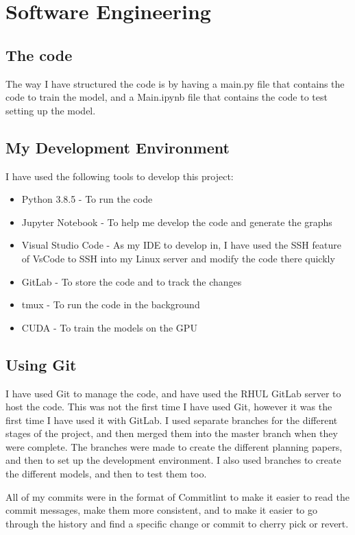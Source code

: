 \documentclass[]{final_report}
\begin{document}
\chapter{Software Engineering}
\section{The code}
The way I have structured the code is by having a main.py file that contains the code to train the model, and a Main.ipynb file that contains the code to test setting up the model.

\section{My Development Environment}
I have used the following tools to develop this project:
\begin{itemize}
    \item Python 3.8.5\cite{Python} - To run the code
    \item Jupyter Notebook\cite{Jupyter} - To help me develop the code and generate the graphs
    \item Visual Studio Code\cite{VsCode} - As my IDE to develop in, I have used the SSH feature of VsCode to SSH into my Linux server and modify the code there quickly
    \item GitLab\cite{RHULGitLab} - To store the code and to track the changes
    \item tmux\cite{tmux} - To run the code in the background
    \item CUDA\cite{CUDA} - To train the models on the GPU
\end{itemize}

\section{Using Git}
I have used Git to manage the code, and have used the RHUL GitLab server to host the code.
This was not the first time I have used Git, however it was the first time I have used it with GitLab.
I used separate branches for the different stages of the project, and then merged them into the master branch when they were complete.
The branches were made to create the different planning papers, and then to set up the development environment.
I also used branches to create the different models, and then to test them too.

All of my commits were in the format of Commitlint\cite{CommitLint} to make it easier to read the commit messages, make them more consistent, 
and to make it easier to go through the history and find a specific change or commit to cherry pick or revert.
\end{document}
